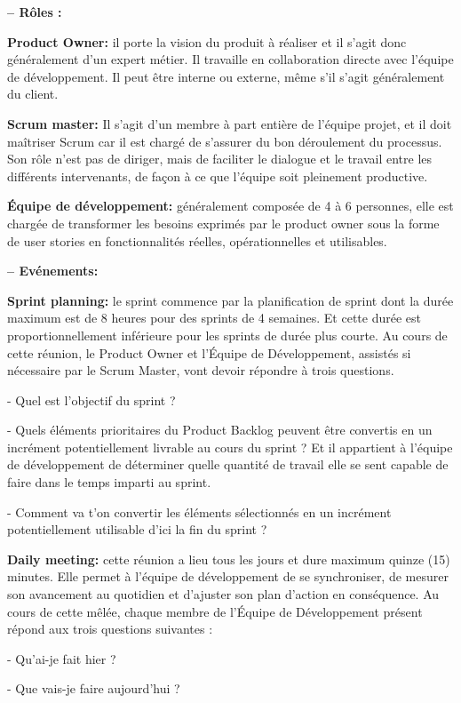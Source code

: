 \documentclass[a4paper, 12pt]{report}
\begin{document}
\begin{itemize}
\textbf{-- Rôles :} 

\textbf{Product Owner:} il porte la vision du produit à réaliser et il s’agit donc généralement d’un expert métier. Il travaille en collaboration directe avec l’équipe de développement. Il peut être interne ou externe, même s’il s’agit généralement du client. 

\textbf{Scrum master:} Il s’agit d’un membre à part entière de l’équipe projet, et il doit  maîtriser Scrum car il est chargé de s’assurer du bon déroulement du processus. Son rôle n’est pas de diriger, mais de faciliter le dialogue  et le travail entre les différents intervenants, de façon à ce que  l’équipe soit pleinement productive. 

\textbf{Équipe de développement:} généralement composée de 4 à 6 personnes, elle est chargée de transformer les besoins exprimés par le product  owner sous la forme de user stories en fonctionnalités réelles,  opérationnelles et utilisables. 

\textbf{-- Evénements:} 

\textbf{Sprint planning:} le sprint commence par la planification de sprint dont la durée maximum est de 8 heures pour des sprints de 4 semaines. Et cette durée est proportionnellement inférieure pour les sprints de durée plus courte. Au cours de cette réunion, le Product Owner et l'Équipe de Développement, assistés si nécessaire par le Scrum Master, vont devoir répondre à trois questions. 

- Quel est l’objectif du sprint ? 

- Quels éléments prioritaires du Product Backlog peuvent être convertis en un incrément potentiellement livrable au cours du sprint ? Et il appartient à l’équipe de développement de déterminer quelle quantité de travail elle se sent capable de faire dans le temps imparti au sprint.  

- Comment va t’on convertir les éléments sélectionnés en un incrément potentiellement utilisable d’ici la fin du sprint ? 

\textbf{Daily meeting:} cette réunion a lieu tous les jours et dure maximum quinze (15) minutes. Elle permet à l'équipe de développement de se synchroniser, de mesurer son avancement  au quotidien et d’ajuster son plan d’action en conséquence. Au cours de cette mêlée, chaque membre de l'Équipe de Développement présent répond aux trois questions suivantes : 

- Qu'ai-je fait hier ?  

- Que vais-je faire aujourd'hui ?  


\end{itemize}
\end{document}

